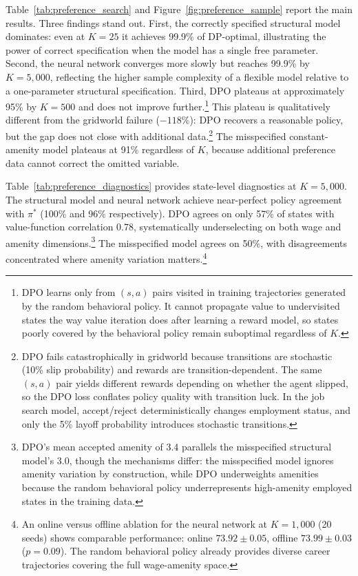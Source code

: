 Table~\ref{tab:preference_search} and Figure~\ref{fig:preference_sample} report the main results. Three findings stand out. First, the correctly specified structural model dominates: even at $K = 25$ it achieves 99.9\% of DP-optimal, illustrating the power of correct specification when the model has a single free parameter. Second, the neural network converges more slowly but reaches 99.9\% by $K = 5{,}000$, reflecting the higher sample complexity of a flexible model relative to a one-parameter structural specification. Third, DPO plateaus at approximately 95\% by $K = 500$ and does not improve further.\footnote{DPO learns only from $(s,a)$ pairs visited in training trajectories generated by the random behavioral policy. It cannot propagate value to undervisited states the way value iteration does after learning a reward model, so states poorly covered by the behavioral policy remain suboptimal regardless of $K$.} This plateau is qualitatively different from the gridworld failure ($-118\%$): DPO recovers a reasonable policy, but the gap does not close with additional data.\footnote{DPO fails catastrophically in gridworld because transitions are stochastic (10\% slip probability) and rewards are transition-dependent. The same $(s,a)$ pair yields different rewards depending on whether the agent slipped, so the DPO loss conflates policy quality with transition luck. In the job search model, accept/reject deterministically changes employment status, and only the 5\% layoff probability introduces stochastic transitions.} The misspecified constant-amenity model plateaus at 91\% regardless of $K$, because additional preference data cannot correct the omitted variable.

\begin{table}[htbp]
\centering
\caption{Diagnostics at $K = 5{,}000$ (single seed): policy agreement with $\pi^*$, value-function correlation, and mean accepted wage and amenity for each method.}
\label{tab:preference_diagnostics}

\end{table}

Table~\ref{tab:preference_diagnostics} provides state-level diagnostics at $K = 5{,}000$. The structural model and neural network achieve near-perfect policy agreement with $\pi^*$ (100\% and 96\% respectively). DPO agrees on only 57\% of states with value-function correlation 0.78, systematically underselecting on both wage and amenity dimensions.\footnote{DPO's mean accepted amenity of 3.4 parallels the misspecified structural model's 3.0, though the mechanisms differ: the misspecified model ignores amenity variation by construction, while DPO underweights amenities because the random behavioral policy underrepresents high-amenity employed states in the training data.} The misspecified model agrees on 50\%, with disagreements concentrated where amenity variation matters.\footnote{An online versus offline ablation for the neural network at $K = 1{,}000$ (20 seeds) shows comparable performance: online $73.92 \pm 0.05$, offline $73.99 \pm 0.03$ ($p = 0.09$). The random behavioral policy already provides diverse career trajectories covering the full wage-amenity space.}


